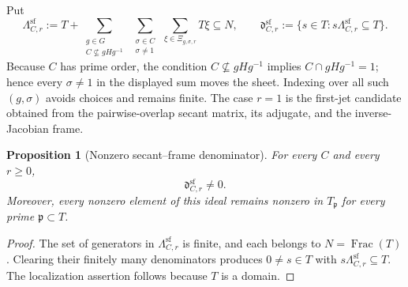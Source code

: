 \documentclass[11pt]{article}
\newtheorem{proposition}[theorem]{Proposition}
\theoremstyle{remark}
\theoremstyle{definition}
\DeclareMathOperator{\Frac}{Frac}
\newcommand{\C}{\mathbb C}
\begin{document}
Put
\[
  \Lambda_{C,r}^{\mathrm{sf}}
  :=T+\sum_{\substack{g\in G\\C\nsubseteq gHg^{-1}}}
       \ \sum_{\substack{\sigma\in C\\\sigma\ne1}}
       \ \sum_{\xi\in\Xi_{g,\sigma,r}}T\xi\subseteq N,
  \qquad
  \mathfrak d_{C,r}^{\mathrm{sf}}
  :=\{s\in T:s\Lambda_{C,r}^{\mathrm{sf}}\subseteq T\}.
\]
Because \(C\) has prime order, the condition
\(C\nsubseteq gHg^{-1}\) implies
\(C\cap gHg^{-1}=1\); hence every \(\sigma\ne1\) in the displayed sum moves
the sheet.  Indexing over all such \((g,\sigma)\) avoids choices and remains
finite.  The case \(r=1\) is the first-jet candidate obtained from the
pairwise-overlap secant matrix, its adjugate, and the inverse-Jacobian frame.

\begin{proposition}[Nonzero secant--frame denominator]
\label{prop:nonzero-secant-frame-denominator}
For every \(C\) and every \(r\geq0\),
\[
  \mathfrak d_{C,r}^{\mathrm{sf}}\neq0.
\]
Moreover, every nonzero element of this ideal remains nonzero in
\(T_{\mathfrak p}\) for every prime \(\mathfrak p\subset T\).
\end{proposition}

\begin{proof}
The set of generators in \(\Lambda_{C,r}^{\mathrm{sf}}\) is finite, and
each belongs to \(N=\Frac(T)\).  Clearing their finitely many denominators
produces \(0\neq s\in T\) with
\(s\Lambda_{C,r}^{\mathrm{sf}}\subseteq T\).  The localization assertion
follows because \(T\) is a domain.
\end{proof}
\end{document}
